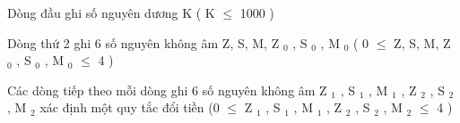 Dòng đầu ghi số nguyên dương K ( K  $\le$  1000 )

Dòng thứ 2 ghi 6 số nguyên không âm Z, S, M, Z $_ 0 $ , S $_ 0 $ , M $_ 0 $ ( 0  $\le$  Z, S, M, Z $_ 0 $ , S $_ 0 $ , M $_ 0 $  $\le$  4 )

Các dòng tiếp theo mỗi dòng ghi 6 số nguyên không âm Z $_ 1 $ , S $_ 1 $ , M $_ 1 $ , Z $_ 2 $ , S $_ 2 $ , M $_ 2 $ xác định một quy tắc đổi tiền (0  $\le$  Z $_ 1 $ , S $_ 1 $ , M $_ 1 $ , Z $_ 2 $ , S $_ 2 $ , M $_ 2 $  $\le$  4 )

\